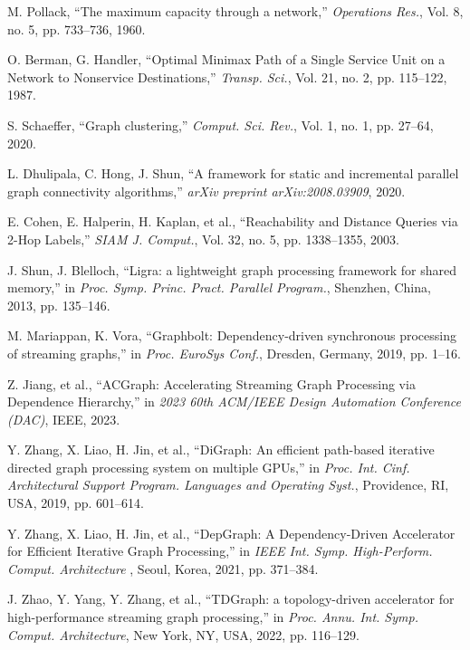 \documentclass[10pt,journal,compsoc]{IEEEtran}
\begin{document}
\begin{thebibliography}{100}
M. Pollack, ``The maximum capacity through a network,'' \textit{Operations Res.}, Vol. 8, no. 5, pp. 733--736, 1960.

O. Berman, G. Handler, ``Optimal Minimax Path of a Single Service Unit on a Network to Nonservice Destinations,'' \textit{Transp. Sci.}, Vol. 21, no. 2, pp. 115--122, 1987.

S. Schaeffer, ``Graph clustering,'' \textit{Comput. Sci. Rev.}, Vol. 1, no. 1, pp. 27--64, 2020.

L. Dhulipala, C. Hong, J. Shun, ``A framework for static and incremental parallel graph connectivity algorithms,'' \textit{arXiv preprint arXiv:2008.03909}, 2020. 

E. Cohen, E. Halperin, H. Kaplan, et al., ``Reachability and Distance Queries via 2-Hop Labels,'' \textit{SIAM J. Comput.}, Vol. 32, no. 5, pp. 1338--1355, 2003.

J. Shun, J. Blelloch, ``Ligra: a lightweight graph processing framework for shared memory,'' in \textit{Proc. Symp. Princ. Pract. Parallel Program.}, Shenzhen, China, 2013, pp. 135--146.

M. Mariappan, K. Vora, ``Graphbolt: Dependency-driven synchronous processing of streaming graphs,'' in \textit{Proc. EuroSys Conf.}, Dresden, Germany, 2019, pp. 1--16.

Z. Jiang, et al., ``ACGraph: Accelerating Streaming Graph Processing via Dependence Hierarchy,'' in \textit{2023 60th ACM/IEEE Design Automation Conference (DAC)}, IEEE, 2023.

Y. Zhang, X. Liao, H. Jin, et al., ``DiGraph: An efficient path-based iterative directed graph processing system on multiple GPUs,'' in \textit{Proc. Int. Cinf. Architectural Support Program. Languages and Operating Syst.}, Providence, RI, USA, 2019, pp. 601--614.


Y. Zhang, X. Liao, H. Jin, et al., ``DepGraph: A Dependency-Driven Accelerator for Efficient Iterative Graph Processing,'' in \textit{IEEE Int. Symp. High-Perform. Comput. Architecture }, Seoul, Korea, 2021, pp. 371--384.

J. Zhao, Y. Yang, Y. Zhang, et al., ``TDGraph: a topology-driven accelerator for high-performance streaming graph processing,'' in \textit{Proc. Annu. Int. Symp. Comput. Architecture}, New York, NY, USA, 2022, pp. 116--129.


\end{thebibliography}
\end{document}
